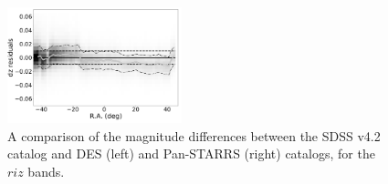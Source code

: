 \documentclass[fleqn,usenatbib]{mnras}
\begin{document}
\begin{figure}
    \centering\includegraphics[width=0.45\textwidth]{figures/colorResidPSDR2v42bright_dz_RA_Hess.png}
\caption{A comparison of the magnitude differences between the SDSS v4.2 catalog
and DES (left) and Pan-STARRS (right) catalogs, for the $riz$ bands.}
\label{fig:DESPSRA}
\end{figure}
\end{document}
